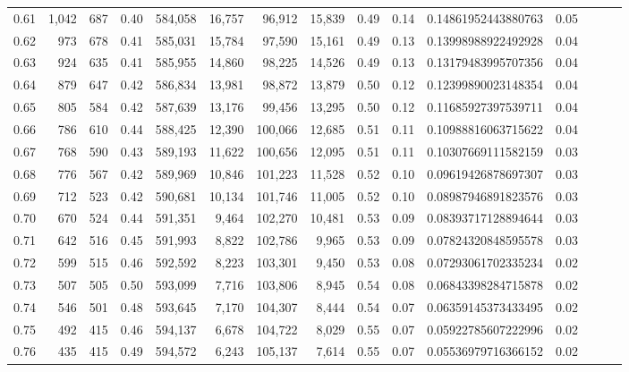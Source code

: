 \begin{tabular}{rrrrrrrrrrrrrrr}
0.61 &   1,042 &    687 &  0.40 &  584,058 &   16,757 &   96,912 &   15,839 &  0.49 &  0.14 &   0.14861952443880763 &      0.05 \\
0.62 &     973 &    678 &  0.41 &  585,031 &   15,784 &   97,590 &   15,161 &  0.49 &  0.13 &   0.13998988922492928 &      0.04 \\
0.63 &     924 &    635 &  0.41 &  585,955 &   14,860 &   98,225 &   14,526 &  0.49 &  0.13 &   0.13179483995707356 &      0.04 \\
0.64 &     879 &    647 &  0.42 &  586,834 &   13,981 &   98,872 &   13,879 &  0.50 &  0.12 &   0.12399890023148354 &      0.04 \\
0.65 &     805 &    584 &  0.42 &  587,639 &   13,176 &   99,456 &   13,295 &  0.50 &  0.12 &   0.11685927397539711 &      0.04 \\
0.66 &     786 &    610 &  0.44 &  588,425 &   12,390 &  100,066 &   12,685 &  0.51 &  0.11 &   0.10988816063715622 &      0.04 \\
0.67 &     768 &    590 &  0.43 &  589,193 &   11,622 &  100,656 &   12,095 &  0.51 &  0.11 &   0.10307669111582159 &      0.03 \\
0.68 &     776 &    567 &  0.42 &  589,969 &   10,846 &  101,223 &   11,528 &  0.52 &  0.10 &   0.09619426878697307 &      0.03 \\
0.69 &     712 &    523 &  0.42 &  590,681 &   10,134 &  101,746 &   11,005 &  0.52 &  0.10 &   0.08987946891823576 &      0.03 \\
0.70 &     670 &    524 &  0.44 &  591,351 &    9,464 &  102,270 &   10,481 &  0.53 &  0.09 &   0.08393717128894644 &      0.03 \\
0.71 &     642 &    516 &  0.45 &  591,993 &    8,822 &  102,786 &    9,965 &  0.53 &  0.09 &   0.07824320848595578 &      0.03 \\
0.72 &     599 &    515 &  0.46 &  592,592 &    8,223 &  103,301 &    9,450 &  0.53 &  0.08 &   0.07293061702335234 &      0.02 \\
0.73 &     507 &    505 &  0.50 &  593,099 &    7,716 &  103,806 &    8,945 &  0.54 &  0.08 &   0.06843398284715878 &      0.02 \\
0.74 &     546 &    501 &  0.48 &  593,645 &    7,170 &  104,307 &    8,444 &  0.54 &  0.07 &   0.06359145373433495 &      0.02 \\
0.75 &     492 &    415 &  0.46 &  594,137 &    6,678 &  104,722 &    8,029 &  0.55 &  0.07 &   0.05922785607222996 &      0.02 \\
0.76 &     435 &    415 &  0.49 &  594,572 &    6,243 &  105,137 &    7,614 &  0.55 &  0.07 &   0.05536979716366152 &      0.02 \\

\end{tabular}
